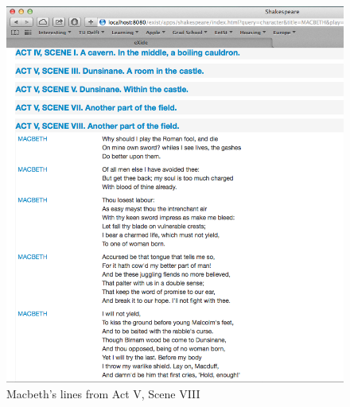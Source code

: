 \documentclass[Shakespeare.tex]{subfiles}
\begin{document}
\begin{figure} [H]
	\centering
	\includegraphics[width=1\textwidth]{./Figures/MacbethCharacterSceneDetails.png}
	\caption{Macbeth's lines from Act V, Scene VIII}
	\label{fig:macbethlines}
\end{figure}
\end{document}
